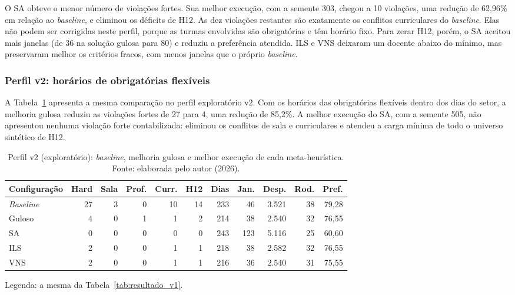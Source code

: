 O SA obteve o menor número de violações fortes. Sua melhor execução, com a semente 303, chegou a 10 violações, uma redução de 62,96\% em relação ao \textit{baseline}, e eliminou os déficits de H12. As dez violações restantes são exatamente os conflitos curriculares do \textit{baseline}. Elas não podem ser corrigidas neste perfil, porque as turmas envolvidas são obrigatórias e têm horário fixo. Para zerar H12, porém, o SA aceitou mais janelas (de 36 na solução gulosa para 80) e reduziu a preferência atendida. ILS e VNS deixaram um docente abaixo do mínimo, mas preservaram melhor os critérios fracos, com menos janelas que o próprio \textit{baseline}.

\subsubsection{Perfil v2: horários de obrigatórias flexíveis}

A Tabela~\ref{tab:resultado_v2} apresenta a mesma comparação no perfil exploratório v2. Com os horários das obrigatórias flexíveis dentro dos dias do setor, a melhoria gulosa reduziu as violações fortes de 27 para 4, uma redução de 85,2\%. A melhor execução do SA, com a semente 505, não apresentou nenhuma violação forte contabilizada: eliminou os conflitos de sala e curriculares e atendeu a carga mínima de todo o universo sintético de H12.

\begin{table}[htbp]
  \centering
  \caption{Perfil v2 (exploratório): \textit{baseline}, melhoria gulosa e melhor execução de cada meta-heurística. Fonte: elaborada pelo autor (2026).}
  \label{tab:resultado_v2}
  \small
  \setlength{\tabcolsep}{4pt}
  \begin{tabular}{lrrrrrrrrrr}
    \toprule
    \textbf{Configuração} & \textbf{Hard} & \textbf{Sala} & \textbf{Prof.} & \textbf{Curr.} & \textbf{H12} & \textbf{Dias} & \textbf{Jan.} & \textbf{Desp.} & \textbf{Rod.} & \textbf{Pref.} \\
    \midrule
    \textit{Baseline} & 27 & 3 & 0 & 10 & 14 & 233 &  46 & 3.521 & 38 & 79,28 \\
    Guloso            &  4 & 0 & 1 &  1 &  2 & 214 &  38 & 2.540 & 32 & 76,55 \\
    SA                &  0 & 0 & 0 &  0 &  0 & 243 & 123 & 5.116 & 25 & 60,60 \\
    ILS               &  2 & 0 & 0 &  1 &  1 & 218 &  38 & 2.582 & 32 & 76,55 \\
    VNS               &  2 & 0 & 0 &  1 &  1 & 216 &  36 & 2.540 & 31 & 75,55 \\
    \bottomrule
  \end{tabular}

  \vspace{0.2cm}
  \parbox{0.95\textwidth}{\footnotesize Legenda: a mesma da Tabela~\ref{tab:resultado_v1}.}
\end{table}

